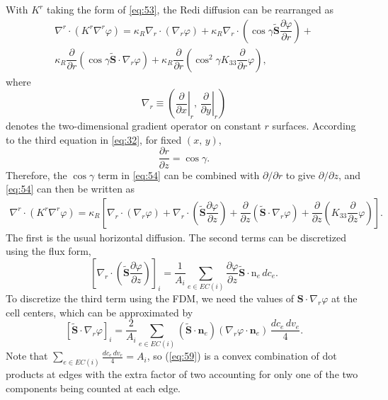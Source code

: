 \documentclass[12pt]{report}
\def\p{\partial}
\def\tilde{\widetilde}
\def\bs{\boldsymbol}
\def\nb{\bs{\mathrm{n}}}
\begin{document}
With $K^r$ taking the form of \eqref{eq:53}, the Redi
diffusion can be rearranged as
\begin{multline}
\label{eq:54}
  \nabla^r\cdot(K^r\nabla^r\varphi) = \kappa_R  \nabla_r\cdot(\nabla_r\varphi)
  + \kappa_R \nabla_r\cdot\left(\cos\gamma\tilde{\mathbf{S}}\dfrac{\p\varphi}{\p
      r}\right) +\\ \kappa_R \dfrac{\p}{\p
    r}\left(\cos\gamma\tilde{\mathbf{S}}\cdot\nabla_r\varphi\right) +
   \kappa_R \dfrac{\p}{\p r}\left(\cos^2\gamma K_{33}\dfrac{\p}{\p
      r}\varphi\right) , 
\end{multline}
where 
$$\nabla_r \equiv \left(\left.\frac{\p}{\p x}\right|_r,\, \left.\frac{\p}{\p
    y}\right|_r\right)$$
denotes the two-dimensional gradient operator on
constant $r$ surfaces. According to the third equation in
\eqref{eq:32}, for fixed $(x,\,y)$, 
\begin{displaymath}
  \dfrac{\p r}{\p z} = \cos\gamma.
\end{displaymath}
Therefore, the $\cos\gamma$ term in \eqref{eq:54} can be combined with
$\p/\p r$ to give $\p/\p z$, and \eqref{eq:54} can then be written as
\begin{multline}
\label{eq:55}
  \nabla^r\cdot(K^r\nabla^r\varphi) = \kappa_R \left[ \nabla_r\cdot(\nabla_r\varphi)
  + \nabla_r\cdot\left(\tilde{\mathbf{S}}\dfrac{\p\varphi}{\p
      z}\right) + \dfrac{\p}{\p
    z}\left(\tilde{\mathbf{S}}\cdot\nabla_r\varphi\right) +
  \dfrac{\p}{\p z}\left( K_{33}\dfrac{\p}{\p
      z}\varphi\right) \right].
\end{multline}
The first is the usual horizontal diffusion. The second terms can be
discretized using the flux form,
\begin{equation}
  \label{eq:58}
  \left[ \nabla_r\cdot\left(\tilde{\mathbf{S}}\dfrac{\p\varphi}{\p
      z}\right)\right]_i = 
\frac{1}{A_i} \sum_{e\in EC(i)} \dfrac{\p\varphi}{\p z}\tilde{\mathbf{S}}\cdot\nb_e \, dc_e.
\end{equation}
 To discretize the
third term using the FDM, we need the values of
$\mathbf{S}\cdot\nabla_r\varphi$ at the cell centers, which can be
approximated by
\begin{equation}
\label{eq:59}
  \left[\tilde{\mathbf{S}}\cdot\nabla_r\varphi\right]_i = \frac{2}{A_i} \sum_{e\in
    EC(i)} \left( \tilde{\mathbf{S}}\cdot\mathbf{n}_e \right) \left( {\nabla_r\varphi}\cdot\mathbf{n}_e \right) \, \frac{dc_e \, dv_e}{4}.
\end{equation}
Note that $\sum_{e\in EC(i)} \frac{dc_e \, dv_e}{4}=A_i$, so (\ref{eq:59}) is a convex combination of dot products at edges with the extra factor of two accounting for only one of the two components being counted at each edge.
\end{document}
